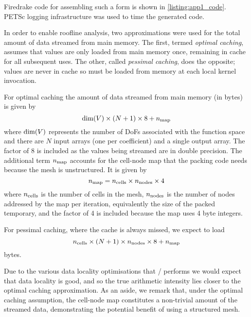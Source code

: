 \documentclass[thesis]{subfiles}
\begin{document}
Firedrake code for assembling such a form is shown in \cref{listing:app1_code}.
PETSc logging infrastructure was used to time the generated code.

In order to enable roofline analysis, two approximations were used for the total amount of data streamed from main memory.
The first, termed \emph{optimal caching}, assumes that values are only loaded from main memory once, remaining in cache for all subsequent uses.
The other, called \emph{pessimal caching}, does the opposite; values are never in cache so must be loaded from memory at each local kernel invocation.

For optimal caching the amount of data streamed from main memory (in bytes) is given by
\begin{equation}
  \textnormal{dim}(V) \times (N + 1) \times 8 + n_{\textnormal{map}}
\end{equation}
where $\textnormal{dim}(V)$ represents the number of DoFs associated with the function space and there are $N$ input arrays (one per coefficient) and a single output array.
The factor of 8 is included as the values being streamed are in double precision.
The additional term $n_{\textnormal{map}}$ accounts for the cell-node map that the packing code needs because the mesh is unstructured.
It is given by
\begin{equation}
  n_{\textnormal{map}} = n_{\textnormal{cells}} \times n_{\textnormal{nodes}} \times 4
\end{equation}
where $n_{\textnormal{cells}}$ is the number of cells in the mesh, $n_{\textnormal{nodes}}$ is the number of nodes addressed by the map per iteration, equivalently the size of the packed temporary, and the factor of 4 is included because the map uses 4 byte integers.

For pessimal caching, where the cache is always missed, we expect to load
\begin{equation}
  n_{\textnormal{cells}} \times (N + 1) \times n_{\textnormal{nodes}} \times 8 + n_{\textnormal{map}}
\end{equation}
bytes.

Due to the various data locality optimisations that / performs we would expect that data locality is good, and so the true arithmetic intensity lies closer to the optimal caching approximation.
As an aside, we remark that, under the optimal caching assumption, the cell-node map constitutes a non-trivial amount of the streamed data, demonstrating the potential benefit of using a structured mesh.
\end{document}
